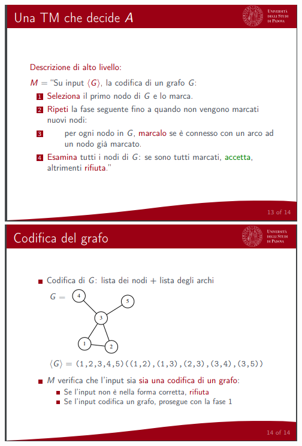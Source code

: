 \documentclass[]{article}
\begin{document}
\begin{center}
					\includegraphics[scale=0.8]{algoritmo4.png}
					\includegraphics[scale=0.8]{algoritmo5.png}
				\end{center}
\end{document}
